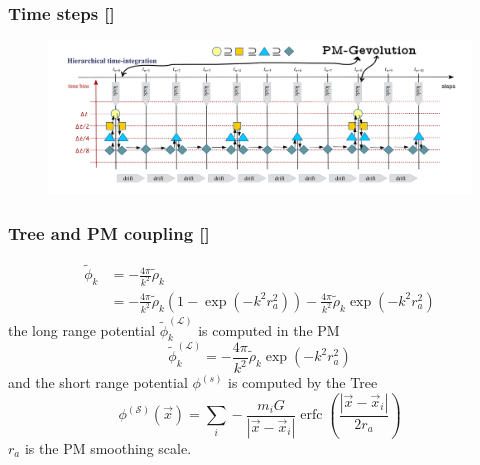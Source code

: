 \documentclass{beamer}
\makeatletter
\newcommand{\mylabel}{%
   [\beamer@againname]}
\DeclareMathOperator{\erfc}{erfc}
\makeatother
\begin{document}
\begin{frame}[label=drift2]
    \frametitle{Time steps\mylabel}
    \begin{figure}
        \includegraphics[width=\textwidth]{images/gadget4-timestep.png}
    \end{figure}
\end{frame}



\begin{frame}[label=forceaddition1]
    \frametitle{Tree and PM coupling\mylabel}
\begin{align*}
    \tilde\phi_k 
    &= -\frac{4\pi}{k^2} \tilde\rho_k \\
    &= -\frac{4\pi}{k^2} \tilde\rho_k \left( 1 - \exp(-k^2 r_a^2) \right)
       -\frac{4\pi}{k^2} \tilde\rho_k \exp(-k^2 r_a^2)
\end{align*}
the long range potential $\tilde\phi^{(\mathcal{L})}_k$ is computed in the PM
\[
    \tilde\phi^{(\mathcal{L})}_k
    = -\frac{4\pi}{k^2} \tilde\rho_k \exp(-k^2 r_a^2)
\]
and the short range potential $\phi^{(s)}$ is computed by the Tree
\[
    \phi^{(\mathcal{S})}(\vec x)
    = \sum_i - \frac{m_i G}{|\vec x - \vec x_i|} 
        \erfc\left(\frac{|\vec x-\vec x_i|}{2 r_a}\right)
\]
$r_a$ is the PM smoothing scale.
\end{frame}
\end{document}
